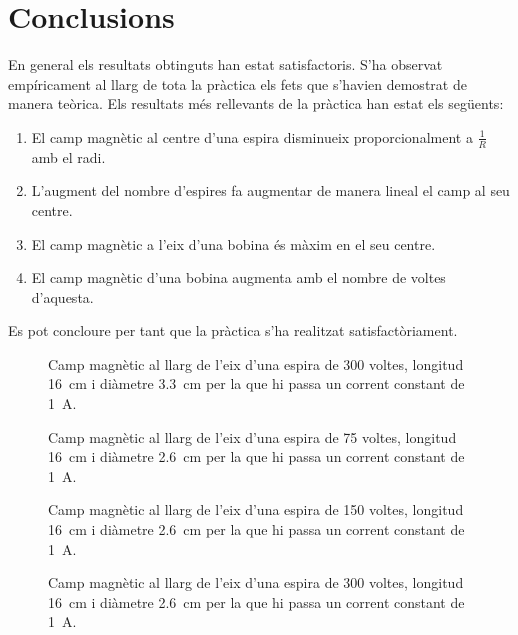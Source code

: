 \section{Conclusions}

En general els resultats obtinguts han estat satisfactoris. S'ha observat empíricament al llarg de tota la pràctica els fets que s'havien demostrat de manera teòrica. Els resultats més rellevants de la pràctica han estat els següents:
\begin{enumerate}
  \item El camp magnètic al centre d'una espira disminueix proporcionalment a \(\frac{1}{R}\) amb el radi.
  \item L'augment del nombre d'espires fa augmentar de manera lineal el camp al seu centre.
  \item El camp magnètic a l'eix d'una bobina és màxim en el seu centre.
  \item El camp magnètic d'una bobina augmenta amb el nombre de voltes d'aquesta.
\end{enumerate}
Es pot concloure per tant que la pràctica s'ha realitzat satisfactòriament.

\begin{figure}
	\sffamily \small
	\centering
	
	\caption{Camp magnètic al llarg de l'eix d'una espira de 300 voltes, longitud \SI{16}{cm} i diàmetre \SI{3.3}{cm} per la que hi passa un corrent constant de \SI{1}{A}.}
	\label{fig:camp 300/33}
\end{figure}

\begin{figure}
	\sffamily \small
	\centering
	
	\caption{Camp magnètic al llarg de l'eix d'una espira de 75 voltes, longitud \SI{16}{cm} i diàmetre \SI{2.6}{cm} per la que hi passa un corrent constant de \SI{1}{A}.}
	\label{fig:camp 75/26}
\end{figure}

\begin{figure}
	\sffamily \small
	\centering
	
	\caption{Camp magnètic al llarg de l'eix d'una espira de 150 voltes, longitud \SI{16}{cm} i diàmetre \SI{2.6}{cm} per la que hi passa un corrent constant de \SI{1}{A}.}
	\label{fig:camp 150/26}
\end{figure}

\begin{figure}
	\sffamily \small
	\centering
	
	\caption{Camp magnètic al llarg de l'eix d'una espira de 300 voltes, longitud \SI{16}{cm} i diàmetre \SI{2.6}{cm} per la que hi passa un corrent constant de \SI{1}{A}.}
	\label{fig:camp 300/26}
\end{figure}
